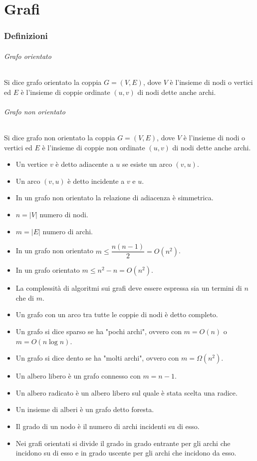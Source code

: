 \chapter{Grafi}
\subsection{Definizioni}
\subparagraph{Grafo orientato}
Si dice grafo orientato la coppia $G=(V, E)$, dove $V$ \`e l'insieme di nodi o vertici ed $E$ \`e l'insieme di coppie ordinate $(u, v)$ di nodi dette anche
archi. 
\subparagraph{Grafo non orientato}
Si dice grafo non orientato la coppia $G=(V, E)$, dove $V$ \`e l'insieme di nodi o vertici ed $E$ \`e l'insieme di coppie non ordinate $(u, v)$ di nodi 
dette anche archi. 
\begin{itemize}
\item Un vertice $v$ \`e detto adiacente a $u$ se esiste un arco $(v, u)$.
\item Un arco $(v, u)$ \`e detto incidente a $v$ e $u$.
\item In un grafo non orientato la relazione di adiacenza \`e simmetrica.
\item $n=|V|$ numero di nodi.
\item $m=|E|$ numero di archi.
\item In un grafo non orientato $m\le\dfrac{n(n-1)}{2}=O(n^2)$.
\item In un grafo orientato $m\le n^2-n=O(n^2)$.
\item La complessit\`a di algoritmi sui grafi deve essere espressa sia un termini di $n$ che di $m$. 
\item Un grafo con un arco tra tutte le coppie di nodi \`e detto completo.
\item Un grafo si dice sparso se ha "pochi archi", ovvero con $m=O(n)$ o $m=O(n\log n)$.
\item Un grafo si dice dento se ha "molti archi", ovvero con $m=\Omega(n^2)$.
\item Un albero libero \`e un grafo connesso con $m=n-1$.
\item Un albero radicato \`e un albero libero sul quale \`e stata scelta una radice. 
\item Un insieme di alberi \`e un grafo detto foresta.
\item Il grado di un nodo \`e il numero di archi incidenti su di esso.
\item Nei grafi orientati si divide il grado in grado entrante per gli archi che incidono su di esso e in grado uscente per gli archi che incidono da esso.

\end{itemize}

